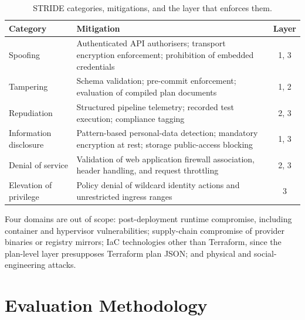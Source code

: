 \documentclass[journal]{IEEEtran}
\begin{document}
\begin{table}[!t]
\caption{STRIDE categories, mitigations, and the layer that enforces them.}
\label{tab:stride}
\centering
\small
\setlength{\tabcolsep}{4pt}
\begin{tabularx}{\columnwidth}{l >{\raggedright\arraybackslash}X c}
\toprule
\textbf{Category} & \textbf{Mitigation} & \textbf{Layer} \\
\midrule
Spoofing & Authenticated API authorisers; transport encryption enforcement;
prohibition of embedded credentials & 1, 3 \\
\addlinespace[2pt]
Tampering & Schema validation; pre-commit enforcement; evaluation of compiled
plan documents & 1, 2 \\
\addlinespace[2pt]
Repudiation & Structured pipeline telemetry; recorded test execution; compliance
tagging & 2, 3 \\
\addlinespace[2pt]
Information disclosure & Pattern-based personal-data detection; mandatory
encryption at rest; storage public-access blocking & 1, 3 \\
\addlinespace[2pt]
Denial of service & Validation of web application firewall association, header
handling, and request throttling & 2, 3 \\
\addlinespace[2pt]
Elevation of privilege & Policy denial of wildcard identity actions and
unrestricted ingress ranges & 3 \\
\bottomrule
\end{tabularx}
\end{table}

Four domains are out of scope: post-deployment runtime compromise, including
container and hypervisor vulnerabilities; supply-chain compromise of provider
binaries or registry mirrors; IaC technologies other than Terraform, since the
plan-level layer presupposes Terraform plan JSON; and physical and
social-engineering attacks.

\section{Evaluation Methodology}
\end{document}
